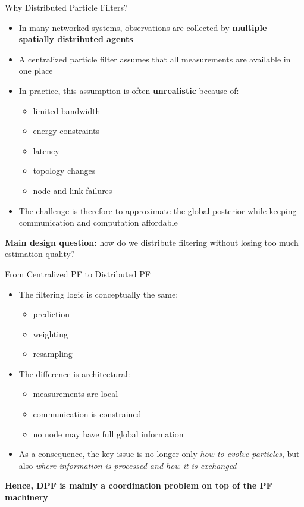 \documentclass[aspectratio=169]{beamer}
\begin{document}
\begin{frame}{Why Distributed Particle Filters?}

\begin{itemize}
    \item In many networked systems, observations are collected by \textbf{multiple spatially distributed agents}
    \item A centralized particle filter assumes that all measurements are available in one place
    \item In practice, this assumption is often \textbf{unrealistic} because of:
    \begin{itemize}
        \item limited bandwidth
        \item energy constraints
        \item latency
        \item topology changes
        \item node and link failures
    \end{itemize}
    \item The challenge is therefore to approximate the global posterior while keeping communication and computation affordable
\end{itemize}

\textbf{Main design question:} how do we distribute filtering without losing too much estimation quality?

\end{frame}


\begin{frame}{From Centralized PF to Distributed PF}

\begin{itemize}
    \item The filtering logic is conceptually the same:
    \begin{itemize}
        \item prediction
        \item weighting
        \item resampling
    \end{itemize}
    \item The difference is architectural:
    \begin{itemize}
        \item measurements are local
        \item communication is constrained
        \item no node may have full global information
    \end{itemize}
    \item As a consequence, the key issue is no longer only \emph{how to evolve particles},
    but also \emph{where information is processed and how it is exchanged}
\end{itemize}

\vspace{0.3cm}

\textbf{Hence, DPF is mainly a coordination problem on top of the PF machinery}

\end{frame}
\end{document}

